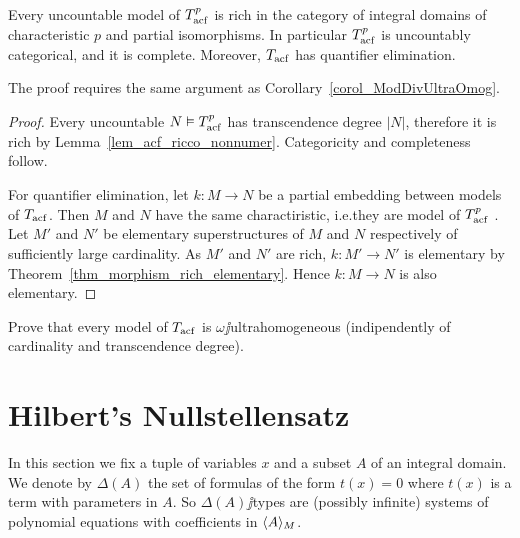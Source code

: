 \documentclass[creche.tex]{subfiles}
\begin{document}
\begin{corollary}\label{corol_acfUltraOmog}
Every uncountable model of $T^p_{\rm acf}$ is rich in the category of integral domains of characteristic $p$ and partial isomorphisms. In particular $T^p_{\rm acf}$ is uncountably categorical, and it is complete. Moreover, $T_{\rm acf}$ has quantifier elimination.
\end{corollary}

The proof requires the same argument as Corollary~\ref{corol_ModDivUltraOmog}.%

\begin{proof}
Every uncountable $N\models T^p_{\rm acf}$ has transcendence degree $|N|$, therefore it is rich by Lemma~\ref{lem_acf_ricco_nonnumer}. Categoricity and completeness follow. 

For quantifier elimination, let $k:M\to N$ be a partial embedding between models of $T_{\rm acf}$. Then $M$ and $N$ have the same charactiristic, i.e.\@ they are model of $T^p_{\rm acf}$ . Let $M'$ and $N'$ be elementary superstructures of $M$ and $N$ respectively of sufficiently large cardinality. As $M'$ and $N'$ are rich, $k:M'\to N'$ is elementary by Theorem~\ref{thm_morphism_rich_elementary}. Hence 
 $k:M\to N$ is also elementary.
\end{proof}


\begin{exercise}
Prove that every model of $T_{\rm acf}$ is $\omega\jj$ultrahomogeneous (indipendently of cardinality and transcendence degree).\QED
\end{exercise}


\section{Hilbert's Nullstellensatz}
\label{Nullstellensatz}

\def\medrel#1{\parbox{5ex}{\hfil$\displaystyle #1$}}
\def\ceq#1#2#3{\parbox{20ex}{$\displaystyle #1$}\medrel{#2}$\displaystyle  #3$}

In this section we fix a tuple of variables \emph{$x$\/} and a subset \emph{$A$} of an integral domain. We denote by \emph{$\Delta(A)$\/} the set of formulas of the form $t(x)=0$ where $t(x)$ is a term with parameters in $A$. So $\Delta(A)\jj$types are (possibly infinite) systems of polynomial equations with coefficients in $\<A\>_M$. 
\end{document}
